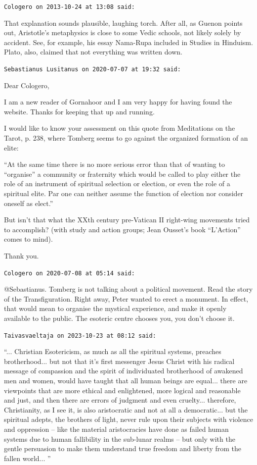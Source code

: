 \begin{footnotesize}
\begin{sffamily}
\hfill

\texttt{Cologero on 2013-10-24 at 13:08 said:}

That explanation sounds plausible, laughing torch. After all, as Guenon points out, Aristotle's metaphysics is close to some Vedic schools, not likely solely by accident. See, for example, his essay Nama-Rupa included in Studies in Hinduism. Plato, also, claimed that not everything was written down.

\hfill

\texttt{Sebastianus Lusitanus on 2020-07-07 at 19:32 said:}

Dear Cologero,

I am a new reader of Gornahoor and I am very happy for having found the website. Thanks for keeping that up and running.

I would like to know your assessment on this quote from Meditations on the Tarot, p. 238, where Tomberg seems to go against the organized formation of an elite:

``At the same time there is no more serious error than that of wanting to ``organise'' a community or fraternity which would be called to play either the role of an instrument of spiritual selection or election, or even the role of a spiritual elite. Par one can neither assume the function of election nor consider oneself as elect.''

But isn't that what the XXth century pre-Vatican II right-wing movements tried to accomplish? (with study and action groups; Jean Ousset's book ``L'Action'' comes to mind).

Thank you.

\hfill

\texttt{Cologero on 2020-07-08 at 05:14 said:}

@Sebastianus. Tomberg is not talking about a political movement. Read the story of the Transfiguration. Right away, Peter wanted to erect a monument. In effect, that would mean to organise the mystical experience, and make it openly available to the public. The esoteric centre chooses you, you don't choose it.

\hfill

\texttt{Taivasvaeltaja on 2023-10-23 at 08:12 said:}

``... Christian Esotericism, as much as all the spiritual systems, preaches brotherhood... but not that it's first messenger Jesus Christ with his radical message of compassion and the spirit of individuated brotherhood of awakened men and women, would have taught that all human beings are equal... there are viewpoints that are more ethical and enlightened, more logical and reasonable and just, and then there are errors of judgment and even cruelty... therefore, Christianity, as I see it, is also aristocratic and not at all a democratic... but the spiritual adepts, the brothers of light, never rule upon their subjects with violence and oppression -- like the material aristocracies have done as failed human systems due to human fallibility in the sub-lunar realms -- but only with the gentle persuasion to make them understand true freedom and liberty from the fallen world... ''


\end{sffamily}
\end{footnotesize}
